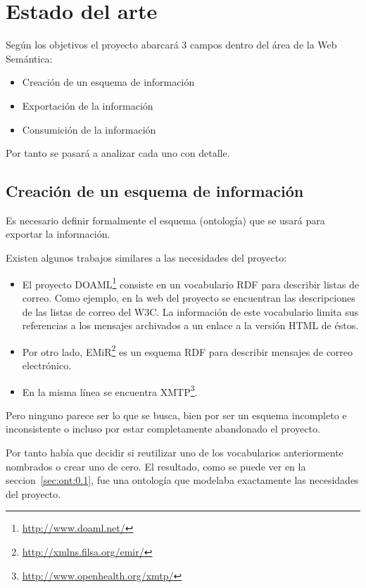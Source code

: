 
\section{Estado del arte}

Según los objetivos el proyecto abarcará 3 campos dentro del área de la
Web Semántica:

\begin{itemize}
 \item Creación de un esquema de información
 \item Exportación de la información
 \item Consumición de la información
\end{itemize}

Por tanto se pasará a analizar cada uno con detalle.

\subsection{Creación de un esquema de información}

Es necesario definir formalmente el esquema (ontología) que se usará para
exportar la información. 

Existen algunos trabajos similares a las necesidades del proyecto:

\begin{itemize}
  \item El proyecto DOAML\footnote{\url{http://www.doaml.net/}} consiste en un 
	vocabulario RDF para describir listas de correo. Como ejemplo, en 
	la web del proyecto se encuentran las descripciones de las listas 
	de correo del W3C. La información de este vocabulario limita sus 
	referencias a los mensajes archivados a un enlace a la versión HTML 
	de éstos.
  \item Por otro lado, EMiR\footnote{\url{http://xmlns.filsa.org/emir/}} es un 
	esquema RDF para describir mensajes de correo electrónico. 
  \item En la misma línea se encuentra XMTP\footnote{\url{http://www.openhealth.org/xmtp/}}.
\end{itemize}

Pero ninguno parece ser lo que se busca, bien por ser un esquema incompleto e
inconsistente o incluso por estar completamente abandonado el proyecto.

Por tanto había que decidir si reutilizar uno de los vocabularios anteriormente
nombrados o crear uno de cero. El resultado, como se puede ver en la
seccion~\ref{sec:ont:0.1}, fue una ontología que modelaba exactamente las
necesidades del proyecto.

